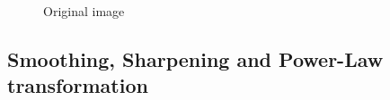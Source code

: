 \begin{figure}[!htb]
\begin{minipage}{0.40\textwidth}
        \caption{Original image}
        \end{minipage}
    \end{figure}

    \pagebreak
    \subsection{Smoothing, Sharpening and Power-Law transformation}

